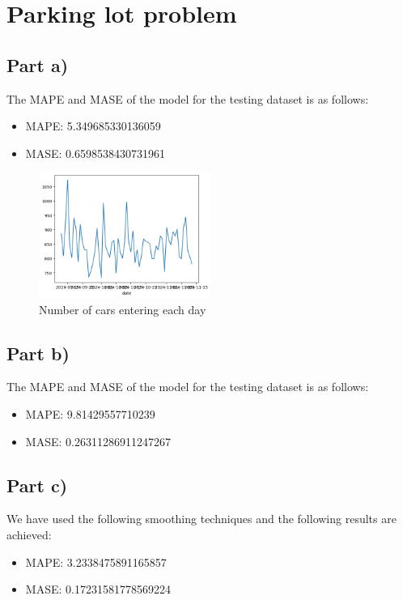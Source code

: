 \section{Parking lot problem}
\subsection{Part a)}
The MAPE and MASE of the model for the testing dataset is as follows:
\begin{itemize}[noitemsep]
	\item MAPE:  5.349685330136059
	\item MASE:  0.6598538430731961
\end{itemize}
\begin{figure}[h]
	\centering
	\includegraphics[width=0.5\textwidth]{1a_plot1.png}
	\caption{Number of cars entering each day}
	\end{figure}


\subsection{Part b)}
The MAPE and MASE of the model for the testing dataset is as follows:
\begin{itemize}[noitemsep]
	\item MAPE:  9.81429557710239
	\item MASE:  0.26311286911247267
\end{itemize}

\subsection{Part c)}
We have used the following smoothing techniques and the following results are achieved:
\begin{itemize}
	\item MAPE:  3.2338475891165857
	\item MASE:  0.17231581778569224
\end{itemize}

